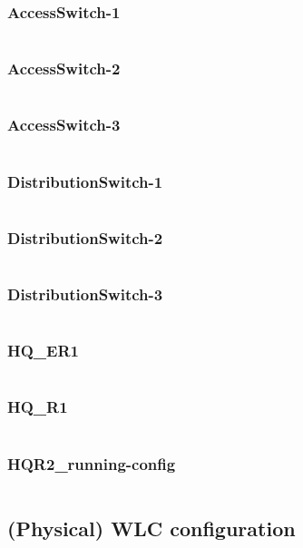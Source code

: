 \subsubsection{AccessSwitch-1} \label{configwlc}
\inputminted[fontsize=\tiny,linenos,breaklines]{text}{./Config/HQ/AccessSwitch-1.txt}
\subsubsection{AccessSwitch-2} \label{configwlc}
\inputminted[fontsize=\tiny,linenos,breaklines]{text}{./Config/HQ/AccessSwitch-2.txt}
\subsubsection{AccessSwitch-3} \label{configwlc}
\inputminted[fontsize=\tiny,linenos,breaklines]{text}{./Config/HQ/AccessSwitch-3.txt}
\subsubsection{DistributionSwitch-1} \label{configwlc}
\inputminted[fontsize=\tiny,linenos,breaklines]{text}{./Config/HQ/DistributionSwitch-1.txt}
\subsubsection{DistributionSwitch-2} \label{configwlc}
\inputminted[fontsize=\tiny,linenos,breaklines]{text}{./Config/HQ/DistributionSwitch-2.txt}
\subsubsection{DistributionSwitch-3} \label{configwlc}
\inputminted[fontsize=\tiny,linenos,breaklines]{text}{./Config/HQ/DistributionSwitch-3.txt}
\subsubsection{HQ\_ER1} \label{configwlc}
\inputminted[fontsize=\tiny,linenos,breaklines]{text}{./Config/HQ/HQ-ER1.txt}
\subsubsection{HQ\_R1} \label{configwlc}
\inputminted[fontsize=\tiny,linenos,breaklines]{text}{./Config/HQ/HQ-R1.txt}
\subsubsection{HQR2\_running-config} \label{configwlc}
\inputminted[fontsize=\tiny,linenos,breaklines]{text}{./Config/HQ/HQR2-running-config.txt}

\subsection{(Physical) WLC configuration} \label{configwlc}
\inputminted[fontsize=\tiny,linenos,breaklines]{text}{./wirelessimplementation/wlc.cisco}




